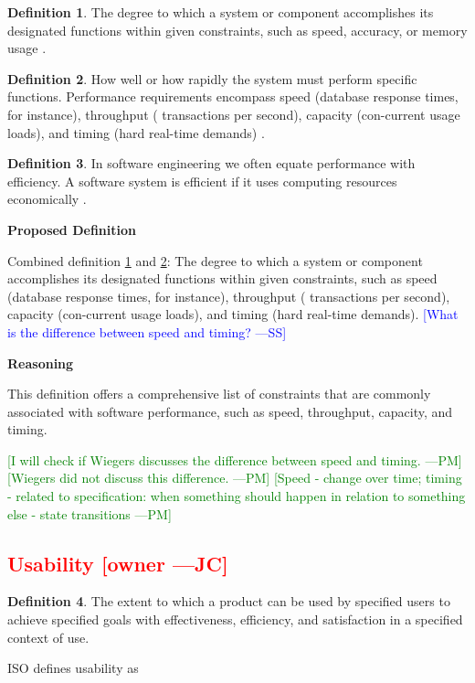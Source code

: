 \documentclass[letterpaper,cleveref]{lipics-v2019}
\newcommand{\authornote}[3]{\textcolor{#1}{[#3 ---#2]}}
\newcommand{\authornote}[3]{}
\newcommand{\wss}[1]{\authornote{blue}{SS}{#1}} %
\newcommand{\jc}[1]{\authornote{red}{JC}{#1}} %
\newcommand{\pmi}[1]{\authornote{green}{PM}{#1}} %
\newcommand{\notdone}[1]{\textcolor{red}{#1}}
\theoremstyle{definition}
\newtheorem{defn}{Definition}
\begin{document}
\begin{defn} \label{PerformanceDefnSelected}
	The degree to which a system or component accomplishes its designated functions
	within given constraints, such as speed, accuracy, or memory usage
	\citep{IEEEStdGlossarySET1990}.
\end{defn}
\begin{defn} \label{PerformanceDefnSelected2}
	How well or how rapidly the system must perform specific functions. Performance
	requirements encompass speed (database response times, for instance), throughput
	( transactions per second), capacity (con-current usage loads), and timing (hard
	real-time demands) \citep{wiegers2003softreq}.
\end{defn}
\begin{defn}
	In software engineering we often equate performance with efficiency. A software
	system is efficient if it uses computing resources economically
	\citep{ghezzi1991fundamentals}.
\end{defn}

\noindent \textbf{Proposed Definition}

Combined definition \ref{PerformanceDefnSelected} and
\ref{PerformanceDefnSelected2}: The degree to which a system or component
accomplishes its designated functions within given constraints, such as speed
(database response times, for instance), throughput ( transactions per second),
capacity (con-current usage loads), and timing (hard real-time
demands). \wss{What is the difference between speed and timing?}

\noindent \textbf{Reasoning}

This definition offers a comprehensive list of constraints that are commonly
associated with software performance, such as speed, throughput, capacity, and
timing.

\pmi{I will check if Wiegers discusses the difference between speed and timing.}
\pmi{Wiegers did not discuss this difference.}
\pmi{Speed - change over time; timing - related to specification: when something
	should happen in relation to something else - state transitions}

\subsection{\notdone{Usability} \jc{owner}} 

\begin{defn}
	The extent to which a product can be used by specified users to achieve
	specified goals with effectiveness, efficiency, and satisfaction in a specified
	context of use.
\end{defn}
ISO defines usability as
\end{document}
